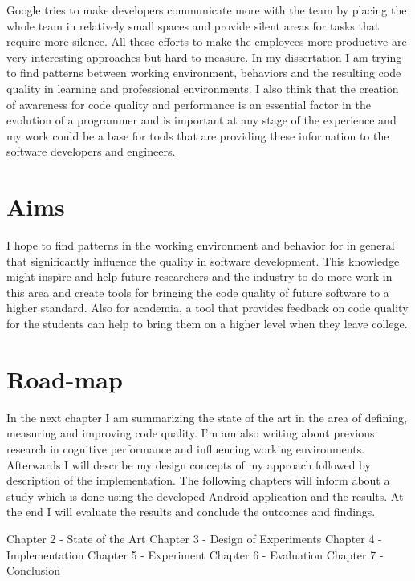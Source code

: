 Google tries to make developers communicate more with the team by placing the whole team in relatively small spaces and provide silent areas for tasks that require more silence. 
All these efforts to make the employees more productive are very interesting approaches but hard to measure. 
\bigbreak
In my dissertation I am trying to find patterns between working environment, behaviors and the resulting code quality in learning and professional environments. I also think that the creation of awareness for code quality and performance is an essential factor in the evolution of a programmer and is important at any stage of the experience and my work could be a base for tools that are providing these information to the software developers and engineers. 

\section{Aims}
I hope to find patterns in the working environment and behavior for in general that significantly influence the quality in software development.
This knowledge might inspire and help future researchers and the industry to do more work in this area and create tools for bringing the code quality of future software to a higher standard. 
Also for academia, a tool that provides feedback on code quality for the students can help to bring them on a higher level when they leave college. 

\section{Road-map}
In the next chapter I am summarizing the state of the art in the area of defining, measuring and improving code quality. I'm am also writing about previous research in cognitive performance and influencing working environments.\\
Afterwards I will describe my design concepts of my approach followed by description of the implementation. 
The following chapters will inform about a study which is done using the developed Android application and the results. 
At the end I will evaluate the results and conclude the outcomes and findings. 

	Chapter 2 - State of the Art
	Chapter 3 - Design of Experiments 
	Chapter 4 - Implementation
	Chapter 5 - Experiment
	Chapter 6 - Evaluation
	Chapter 7 - Conclusion 

